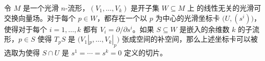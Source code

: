 \begin{theorem}[可交换向量场的典范形式]\label{thm:canonical form for vector fields}
  令 $M$ 是一个光滑 $n$-流形，$(V_1,\dots,V_k)$ 是开子集 $W\subseteq M$ 上
  的线性无关的光滑可交换向量场。对于每个 $p\in W$，都存在一个以 $p$
  为中心的光滑坐标卡 $\bigl(U,(s^i)\bigr)$，使得对于每个 $i=1,\dots,k$
  都有 $V_i=\partial/\partial s^i$。如果 $S\subseteq W$ 是嵌入的余维数
  $k$ 的子流形，$p\in S$ 使得 $T_pS$ 是 $\bigl(V_1|_p,\dots,V_k|_p\bigr)$
  张成空间的补空间，那么上述坐标卡可以被选取为使得 $S\cap U$ 
  是 $s^1=\cdots=s^k=0$ 定义的切片。
\end{theorem}










